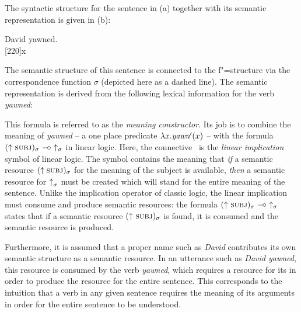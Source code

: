 The syntactic structure for the sentence in (a) together with its semantic representation is given in (b):

\eal
\ex David yawned.
\ex ~\\[-\baselineskip]
\hspace*{-2em}
{}%
\hspace*{3em}%
{}%
\hspace*{2em}%
\Aput*{$\phi$}
[220]{x}
\Bput*{$\sigma$}
\zl

\noindent 
The semantic structure of this sentence is connected to the f"=structure via the correspondence function $\sigma$ (depicted here as a dashed line). The semantic representation is
derived from the following lexical information for the verb \emph{yawned}:

\ea
{}
\z

\noindent 
This formula is referred to as the \emph{meaning constructor}. Its job is to combine the meaning of \emph{yawned} -- a one place predicate
$\lambda x. \textit{yawn}'(x)$ -- with the formula\is{\linimp}
\mbox{$(\up\ \subj)_\sigma\ \linimp\ \ups$} in linear logic. Here, the connective \linimp\ is the
\emph{linear implication} symbol of linear logic. The symbol contains the meaning that \emph{if} a
semantic resource $(\up\;\subj)_\sigma$ for the meaning of the subject is available,
\emph{then} a semantic resource for $\hbox {$\uparrow$\kern .0em}_\sigma$ must be created which will stand for the entire meaning of the sentence.
Unlike the implication operator of classic logic, the linear implication must consume and produce
semantic resources: the formula \mbox{$(\up\ \subj)_\sigma\ \linimp\ \ups$} states that if a
semantic resource \mbox{$(\up\  \subj)_\sigma$} is found, it is consumed and the semantic resource
\ups is produced.

Furthermore, it is assumed that a proper name such as \emph{David} contributes its own semantic structure as a semantic resource. In an utterance such as \emph{David yawned},
this resource is consumed by the verb \emph{yawned}, which requires a resource for its \subj in order to produce the resource for the entire sentence. This corresponds to the intuition
that a verb in any given sentence requires the meaning of its arguments in order for the entire sentence to be understood.
  
